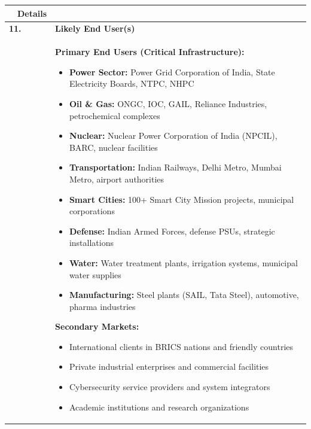 \documentclass[12pt,a4paper]{article}
\begin{document}
\begin{longtable}{|p{0.5cm}p{3cm}|p{11cm}|}
\hline
\rowcolor{lightblue}
\multicolumn{2}{|c|}{\textbf{Field}} & \textbf{Details} \\
\hline
\endhead

\multicolumn{2}{|l|}{\textbf{11.}} & \textbf{Likely End User(s)} \\
\multicolumn{2}{|l|}{} & 
\textbf{Primary End Users (Critical Infrastructure):}
\begin{itemize}[leftmargin=1em, itemsep=0pt]
    \item \textbf{Power Sector:} Power Grid Corporation of India, State Electricity Boards, NTPC, NHPC
    \item \textbf{Oil \& Gas:} ONGC, IOC, GAIL, Reliance Industries, petrochemical complexes
    \item \textbf{Nuclear:} Nuclear Power Corporation of India (NPCIL), BARC, nuclear facilities
    \item \textbf{Transportation:} Indian Railways, Delhi Metro, Mumbai Metro, airport authorities
    \item \textbf{Smart Cities:} 100+ Smart City Mission projects, municipal corporations
    \item \textbf{Defense:} Indian Armed Forces, defense PSUs, strategic installations
    \item \textbf{Water:} Water treatment plants, irrigation systems, municipal water supplies
    \item \textbf{Manufacturing:} Steel plants (SAIL, Tata Steel), automotive, pharma industries
\end{itemize}

\textbf{Secondary Markets:}
\begin{itemize}[leftmargin=1em, itemsep=0pt]
    \item International clients in BRICS nations and friendly countries
    \item Private industrial enterprises and commercial facilities
    \item Cybersecurity service providers and system integrators
    \item Academic institutions and research organizations
\end{itemize} \\
\hline


\end{longtable}
\end{document}
